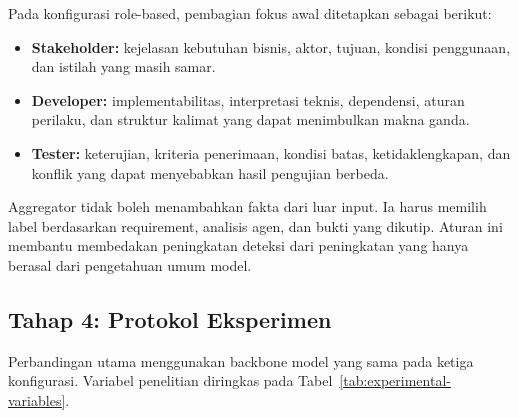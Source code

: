 Pada konfigurasi role-based, pembagian fokus awal ditetapkan sebagai berikut:
\begin{itemize}
\item \textbf{Stakeholder:} kejelasan kebutuhan bisnis, aktor, tujuan, kondisi penggunaan, dan istilah yang masih samar.
\item \textbf{Developer:} implementabilitas, interpretasi teknis, dependensi, aturan perilaku, dan struktur kalimat yang dapat menimbulkan makna ganda.
\item \textbf{Tester:} keterujian, kriteria penerimaan, kondisi batas, ketidaklengkapan, dan konflik yang dapat menyebabkan hasil pengujian berbeda.
\end{itemize}

Aggregator tidak boleh menambahkan fakta dari luar input. Ia harus memilih label berdasarkan requirement, analisis agen, dan bukti yang dikutip. Aturan ini membantu membedakan peningkatan deteksi dari peningkatan yang hanya berasal dari pengetahuan umum model.

\subsection{Tahap 4: Protokol Eksperimen}

Perbandingan utama menggunakan backbone model yang sama pada ketiga konfigurasi. Variabel penelitian diringkas pada Tabel~\ref{tab:experimental-variables}.

\begin{table}[htbp]
\centering
\caption{Variabel dan pengendalian eksperimen}
\label{tab:experimental-variables}
\renewcommand{\arraystretch}{1.2}
\end{table}

